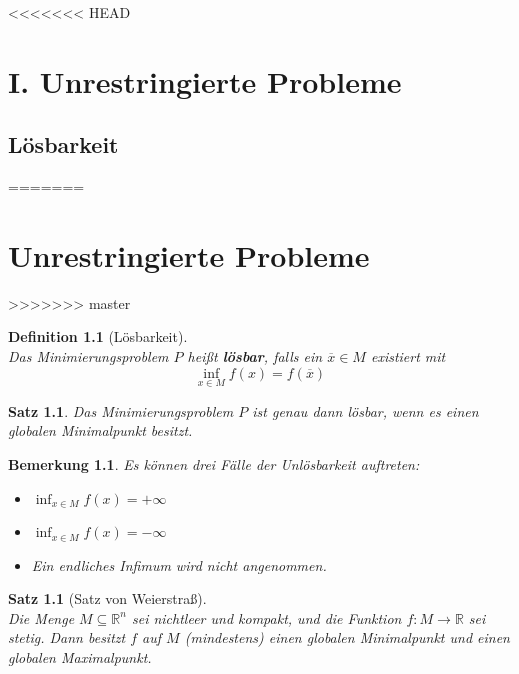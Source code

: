 \documentclass[11pt]{scrreprt}
\newcounter{thm}
\numberwithin{thm}{section}
\newtheorem{definition}[thm]{Definition}
\newtheorem{satz}[thm]{Satz}
\newtheorem*{bemerkung*}{Bemerkung}
\begin{document}
<<<<<<< HEAD
\chapter*{I. Unrestringierte Probleme}
\setcounter{chapter}{1}
\setcounter{section}{1}

\section{Lösbarkeit}
=======
\chapter{Unrestringierte Probleme}

\setcounter{section}{2}
>>>>>>> master

\setcounter{thm}{2}

\begin{definition}[Lösbarkeit] ~\\
	Das Minimierungsproblem $P$ heißt \textbf{lösbar}, falls ein $\overline{x} \in M$ existiert mit
	$$ \inf_{x \in M} f(x) = f(\overline{x}) $$
\end{definition}

\setcounter{thm}{4}

\begin{satz}
	Das Minimierungsproblem $P$ ist genau dann lösbar, wenn es einen globalen Minimalpunkt besitzt.
\end{satz}

\begin{bemerkung*}
	Es können drei Fälle der Unlösbarkeit auftreten:

	\begin{itemize}
		\item $\inf_{x \in M} f(x) = + \infty$
		\item $\inf_{x \in M} f(x) = - \infty$
		\item Ein endliches Infimum wird nicht angenommen.
	\end{itemize}	
\end{bemerkung*}


\begin{satz}[Satz von Weierstraß] ~\\
	Die Menge $M \subseteq \mathbb{R}^n$ sei nichtleer und kompakt, und die Funktion $f \colon M \rightarrow \mathbb{R}$ sei stetig. Dann besitzt $f$ auf $M$ (mindestens) einen globalen Minimalpunkt und einen globalen Maximalpunkt.
\end{satz}

\setcounter{thm}{7}
\end{document}
